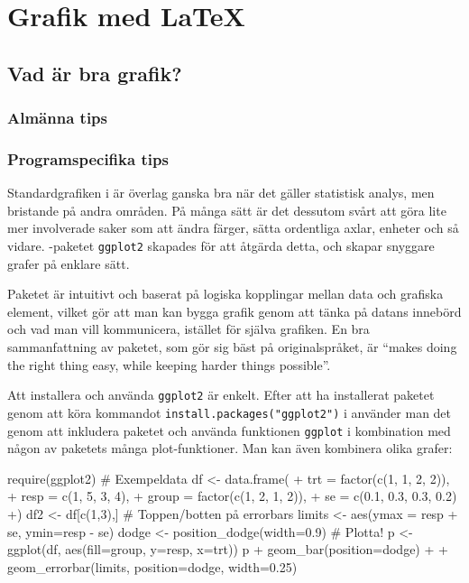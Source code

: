 \documentclass[lang=sv,ptsize=10pt,font=none,nomath,titles=bf,../../a4.tex]{subfiles}
\begin{document}
\section{Grafik med \LaTeX}\label{sec:4}

\subsection{Vad är bra grafik?}
\subsubsection{Almänna tips}
\subsubsection{Programspecifika tips}
\label{sec:ggplot2}
Standardgrafiken i \Rlogo är överlag ganska bra när det gäller statistisk
analys, men bristande på andra områden. På många sätt är det dessutom 
svårt att göra lite mer involverade saker som att ändra färger, sätta
ordentliga axlar, enheter och så vidare. \Rlogo-paketet \texttt{ggplot2}
skapades för att åtgärda detta, och skapar snyggare grafer på enklare
sätt.

Paketet är intuitivt och baserat på logiska kopplingar mellan data och
grafiska element, vilket gör att man kan bygga grafik genom att tänka
på datans innebörd och vad man vill kommunicera, istället för själva 
grafiken. En bra sammanfattning av paketet, som gör sig bäst på
originalspråket, är \foreignquote{british}{makes doing the right thing
easy, while keeping harder things possible}.

Att installera och använda \texttt{ggplot2} är enkelt. Efter att ha 
installerat paketet genom att köra kommandot
\verb|install.packages("ggplot2")|
i \Rlogo använder man det genom att inkludera paketet och använda
funktionen \texttt{ggplot} i kombination med någon av paketets många
plot-funktioner. Man kan även kombinera olika grafer:
\begin{rcode}
require(ggplot2)
# Exempeldata
df <- data.frame(
+   trt = factor(c(1, 1, 2, 2)),
+   resp = c(1, 5, 3, 4), 
+   group = factor(c(1, 2, 1, 2)),
+   se = c(0.1, 0.3, 0.3, 0.2)
+) 
df2 <- df[c(1,3),] 
# Toppen/botten på errorbars
limits <- aes(ymax = resp + se, ymin=resp - se)
dodge <- position_dodge(width=0.9)
# Plotta!
p <- ggplot(df, aes(fill=group, y=resp, x=trt))
p + geom_bar(position=dodge) +
  + geom_errorbar(limits, position=dodge, width=0.25)
\end{rcode}
\end{document}
